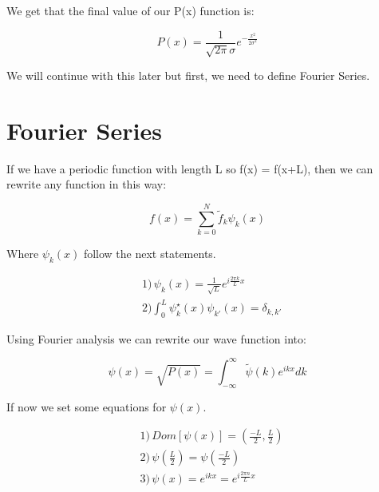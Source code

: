 We get that the final value of our P(x) function is:

\begin{equation}
\label{P(x)_final_def}
    P(x) = \frac{1}{\sqrt{2\pi}\sigma} e^{-\frac{x^2}{2 \sigma^2}}
\end{equation}

We will continue with this later but first, we need to define Fourier Series.

\section{Fourier Series}

If we have a periodic function with length L so f(x) = f(x+L), then we can rewrite any function in this way:

\begin{equation}
\label{fourier}
    f(x) = \sum_{k=0}^{N} \tilde{f}_{k}\psi_{k}(x)
\end{equation}

Where $\psi_k(x)$ follow the next statements.

\begin{equation}\label{psi_k_fourier}
    \begin{split}
        &1)\hspace{2pt} \psi_k(x) = \frac{1}{\sqrt{L}}e^{i\frac{2\pi k}{L}x} \\ 
        &2) \int_0^L \psi_{k}^{\star}(x)\psi_{k'}(x) = \delta_{k,k'}
    \end{split}
\end{equation}


Using Fourier analysis we can rewrite our wave function into:

\begin{equation}
    \label{fourir_psi}
    \psi(x) = \sqrt{P(x)} = \int_{-\infty}^{\infty} \tilde{\psi}(k)e^{ikx}dk 
\end{equation}

If now we set some equations for $\psi(x)$.

\begin{equation}
    \label{rules_psi_fourier}
    \begin{split}
        &1) \hspace{2pt} Dom[\psi(x)]= \left( \frac{-L}{2},\frac{L}{2} \right) \\
        &2) \hspace{2pt} \psi(\frac{L}{2})=\psi(\frac{-L}{2})\\
        &3) \hspace{2pt} \psi(x) = e^{ikx}=e^{i\frac{2\pi n}{L}x}
    \end{split}
\end{equation}

